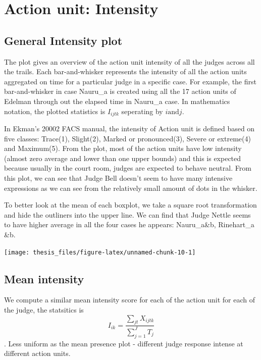 \documentclass{monashthesis}
\begin{document}
\hypertarget{action-unit-intensity}{%
\section{Action unit: Intensity}\label{action-unit-intensity}}

\hypertarget{general-intensity-plot}{%
\subsection{General Intensity plot}\label{general-intensity-plot}}

The plot gives an overview of the action unit intensity of all the judges across all the trails. Each bar-and-whisker represents the intensity of all the action units aggregated on time for a particular judge in a specific case. For example, the first bar-and-whisker in case Nauru\_a is created using all the 17 action units of Edelman through out the elapsed time in Nauru\_a case. In mathematics notation, the plotted statistics is \(I_{ijtk}\) seperating by \(i \text{and} j\).

In Ekman's 20002 FACS manual, the intensity of Action unit is defined based on five classes: Trace(1), Slight(2), Marked or pronounced(3), Severe or extreme(4) and Maximum(5). From the plot, most of the action units have low intensity (almost zero average and lower than one upper bounds) and this is expected because usually in the court room, judges are expected to behave neutral. From this plot, we can see that Judge Bell doesn't seem to have many intensive expressions as we can see from the relatively small amount of dots in the whisker.

To better look at the mean of each boxplot, we take a square root transformation and hide the outliners into the upper line. We can find that Judge Nettle seems to have higher average in all the four cases he appears: Nauru\_a\&b, Rinehart\_a \&b.

\texttt{[image: thesis\_files/figure-latex/unnamed-chunk-10-1]}

\hypertarget{mean-intensity}{%
\subsection{Mean intensity}\label{mean-intensity}}

We compute a similar mean intensity score for each of the action unit for each of the judge, the statsitics is \[I_{ik} = \frac{\sum_{jt}X_{ijtk}}{\sum_{j = 1}^JT_j}\]. Less uniform as the mean presence plot - different judge response intense at different action units.
\end{document}
